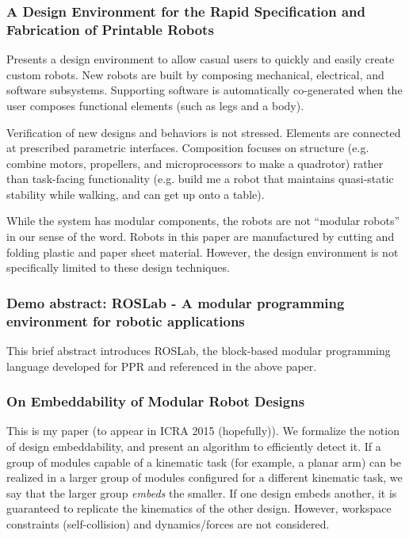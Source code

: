 \documentclass[12pt]{article}
\begin{document}
\subsubsection*{A Design Environment for the Rapid Specification and Fabrication
of Printable Robots \cite{mehta2014design} }

Presents a design environment to allow casual users to quickly and easily create
custom robots.  New robots are built by composing mechanical, electrical, and software
subsystems.  Supporting software is automatically co-generated when the user composes
functional elements (such as legs and a body).

Verification of new designs and behaviors is not stressed.  Elements are connected
at prescribed parametric interfaces. Composition focuses on structure (e.g. combine motors, propellers, and microprocessors to make
a quadrotor) rather than task-facing functionality (e.g. build me a robot that maintains
quasi-static stability while walking, and can get up onto a table).   

While the system has modular components, the robots are not ``modular robots'' in
our sense of the word.  Robots in this paper are manufactured  by cutting and folding
plastic and paper sheet material. However, the design environment is not specifically
limited to these design techniques.


\subsubsection*{Demo abstract: ROSLab - A modular programming environment for robotic
applications \cite{bezzo2014demo} }
This brief abstract introduces ROSLab, the block-based modular programming language
developed for PPR and referenced in the above paper.

\subsubsection*{On Embeddability of Modular Robot Designs \cite{mantzouratos2014embeddability}}
This is my paper (to appear in ICRA 2015 (hopefully)).  We formalize the notion of
design embeddability, and present an algorithm to efficiently detect it.  If a group of modules capable of a kinematic
task (for example, a planar arm) can be realized in a larger group of modules configured for a different kinematic
task, we say that the larger group \textit{embeds} the smaller.
If one design embeds another, it is guaranteed to replicate the kinematics of the
other design.  However, workspace constraints (self-collision) and dynamics/forces
are not considered.
\end{document}
